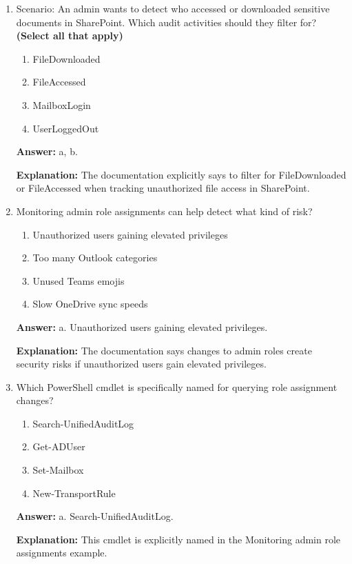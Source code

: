 \documentclass[10pt]{article}
\begin{document}
\begin{enumerate}[leftmargin=*]
\textbf{Explanation:} The documentation lists these advanced scenarios for exported audit data.

\item Scenario: An admin wants to detect who accessed or downloaded sensitive documents in SharePoint. Which audit activities should they filter for? \textbf{(Select all that apply)}
\begin{enumerate}[label=\alph*., leftmargin=1.5em]
\item FileDownloaded
\item FileAccessed
\item MailboxLogin
\item UserLoggedOut
\end{enumerate}
\textbf{Answer:} a, b.

\textbf{Explanation:} The documentation explicitly says to filter for FileDownloaded or FileAccessed when tracking unauthorized file access in SharePoint.

\item Monitoring admin role assignments can help detect what kind of risk?
\begin{enumerate}[label=\alph*., leftmargin=1.5em]
\item Unauthorized users gaining elevated privileges
\item Too many Outlook categories
\item Unused Teams emojis
\item Slow OneDrive sync speeds
\end{enumerate}
\textbf{Answer:} a. Unauthorized users gaining elevated privileges.

\textbf{Explanation:} The documentation says changes to admin roles create security risks if unauthorized users gain elevated privileges.

\item Which PowerShell cmdlet is specifically named for querying role assignment changes?
\begin{enumerate}[label=\alph*., leftmargin=1.5em]
\item Search-UnifiedAuditLog
\item Get-ADUser
\item Set-Mailbox
\item New-TransportRule
\end{enumerate}
\textbf{Answer:} a. Search-UnifiedAuditLog.

\textbf{Explanation:} This cmdlet is explicitly named in the Monitoring admin role assignments example.


\end{enumerate}
\end{document}
